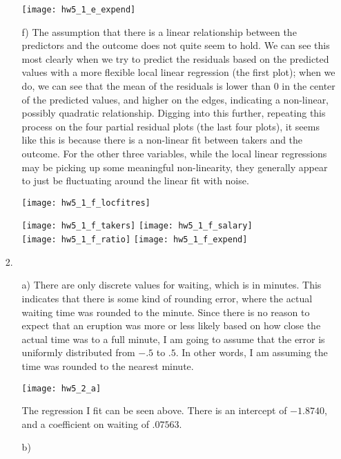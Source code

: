 \documentclass[11pt]{article}
\theoremstyle{definition}
\begin{document}
\begin{itemize}
\begin{itemize}
                \texttt{[image: hw5\_1\_e\_expend]} 
            \item[f)]
                The assumption that there is a linear relationship between the predictors and the outcome does not quite seem to hold. We can see this most clearly when we try to predict the residuals based on the predicted values with a more flexible local linear regression (the first plot); when we do, we can see that the mean of the residuals is lower than $0$ in the center of the predicted values, and higher on the edges, indicating a non-linear, possibly quadratic relationship. Digging into this further, repeating this process on the four partial residual plots (the last four plots), it seems like this is because there is a non-linear fit between takers and the outcome. For the other three variables, while the local linear regressions may be picking up some meaningful non-linearity, they generally appear to just be fluctuating around the linear fit with noise.
                \begin{center}
                    \texttt{[image: hw5\_1\_f\_locfitres]} 
                \end{center}
                \texttt{[image: hw5\_1\_f\_takers]}
                \texttt{[image: hw5\_1\_f\_salary]} \\
                \texttt{[image: hw5\_1\_f\_ratio]}  
                \texttt{[image: hw5\_1\_f\_expend]} \\ 
        \end{itemize}
    \item[2.]
        \begin{itemize}
            \item[a)]
                There are only discrete values for waiting, which is in minutes. This indicates that there is some kind of rounding error, where the actual waiting time was rounded to the minute. Since there is no reason to expect that an eruption was more or less likely based on how close the actual time was to a full minute, I am going to assume that the error is uniformly distributed from $-.5$ to $.5$. In other words, I am assuming the time was rounded to the nearest minute. 
                \begin{center}
                    \texttt{[image: hw5\_2\_a]} 
                \end{center}
                The regression I fit can be seen above. There is an intercept of $-1.8740$, and a coefficient on waiting of $.07563$.
            \item[b)]

\end{itemize}
\end{itemize}
\end{document}
